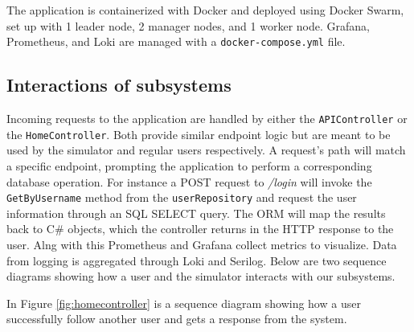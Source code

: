 The application is containerized with Docker and deployed using Docker Swarm, set up with 1 leader node, 2 manager nodes, and 1 worker node. Grafana, Prometheus, and Loki are managed with a \texttt{docker-compose.yml} file.


\subsection{Interactions of subsystems}
Incoming requests to the application are handled by either the \texttt{APIController} or the \texttt{HomeController}. Both provide similar endpoint logic but are meant to be used by the simulator and regular users respectively. A request's path will match a specific endpoint, prompting the application to perform a corresponding database operation. For instance a POST request to \textit{/login} will invoke the \texttt{GetByUsername} method from the \texttt{userRepository} and request the user information through an SQL SELECT query. The ORM will map the results back to C\# objects, which the controller returns in the HTTP response to the user. 
Alng with this Prometheus and Grafana collect metrics to visualize. Data from logging is aggregated through Loki and Serilog. Below are two sequence diagrams showing how a user and the simulator interacts with our subsystems.\newline

In Figure \ref{fig:homecontroller} is a sequence diagram showing how a user successfully follow another user and gets a response from the system.\newline

